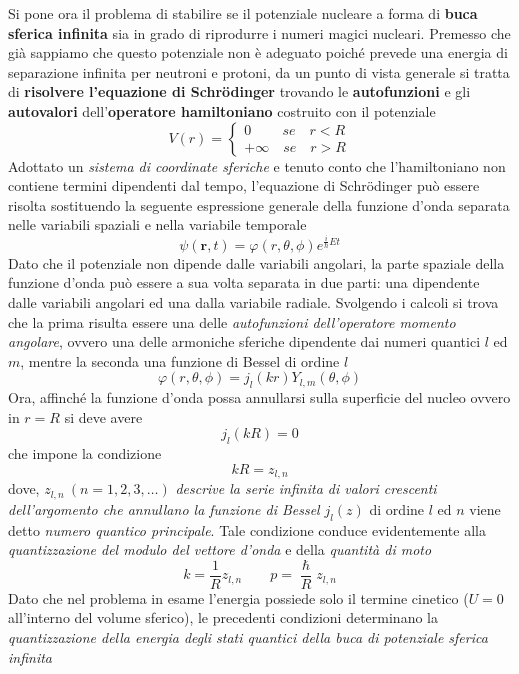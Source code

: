 Si pone ora il problema di stabilire se il potenziale nucleare a forma di \textbf{buca sferica infinita} sia in grado di riprodurre i numeri magici nucleari. Premesso che già sappiamo che questo potenziale non è adeguato poiché prevede una energia di separazione infinita per neutroni e protoni, da un punto di vista generale si tratta di \textbf{risolvere l’equazione di Schrödinger} trovando le \textbf{autofunzioni} e gli \textbf{autovalori} dell’\textbf{operatore hamiltoniano} costruito con il potenziale
\[
V(r) =
\begin{cases}
	0 \qquad \ se \quad r <R \\
	+ \infty \quad se \quad r > R
\end{cases}
\]
Adottato un \emph{sistema di coordinate sferiche} e tenuto conto che l’hamiltoniano non contiene termini dipendenti dal tempo, l’equazione di Schrödinger può essere risolta sostituendo la seguente espressione generale della funzione d’onda separata nelle variabili spaziali e nella variabile temporale
\[
\psi(\bm{r},t) = \varphi(r, \theta, \phi) e^{ \frac{i}{\hslash} Et}
\]
Dato che il potenziale non dipende dalle variabili angolari, la parte spaziale della funzione d’onda può essere a sua volta separata in due parti: una dipendente dalle variabili angolari ed una dalla variabile radiale. Svolgendo i calcoli si trova che la prima risulta essere una delle \emph{autofunzioni dell’operatore momento angolare}, ovvero una delle armoniche sferiche dipendente dai numeri quantici $l$ ed $m$, mentre la seconda una funzione di Bessel di ordine $l$
\begin{equation}
	\varphi (r, \theta, \phi) = j_{l} (kr) Y_{l,m}(\theta,\phi)
	\label{eq:spatial-part-wave-function}
\end{equation}
Ora, affinché la funzione d’onda possa annullarsi sulla superficie del nucleo ovvero in $r=R$ si deve avere
\[
j_{l}(kR) = 0
\]
che impone la condizione
\[
kR = z_{l,n}
\]
dove, $z_{l,n} \ (n= 1,2,3,\dots)$ \emph{descrive la serie infinita di valori crescenti dell’argomento che annullano la funzione di Bessel} $j_{l}(z)$ di ordine $l$ ed $n$ viene detto \emph{numero quantico principale}. Tale condizione conduce evidentemente alla \emph{quantizzazione del modulo del vettore d’onda} e della \emph{quantità di moto}
\[
k = \frac{1}{R} z_{l,n} \qquad p = \frac{\hslash}{R}z_{l,n}
\]
Dato che nel problema in esame l’energia possiede solo il termine cinetico ($U=0$ all’interno del volume sferico), le precedenti condizioni determinano la \emph{quantizzazione della energia degli stati quantici della buca di potenziale sferica infinita}
